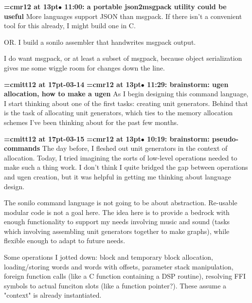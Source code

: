 {\smallskip\noindent\bf\font\titlefont=cmr12 at 13pt\titlefont $\bullet$ 11:00: a portable json2msgpack utility could be useful}\smallskip
More languages support JSON than msgpack. If there isn't a convenient tool for this already, I might build one in C.
\par

OR. I build a sonilo assembler that handwrites msgpack output.
\par

I do want msgpack, or at least a subset of msgpack, because object serialization gives me some wiggle room for changes down the line.
\par

{\medskip\noindent\bf\font\titlefont=cmitt12 at 17pt-03-14}\medskip
{\smallskip\noindent\bf\font\titlefont=cmr12 at 13pt\titlefont $\bullet$ 11:29: brainstorm: ugen allocation, how to make a ugen}\smallskip
As I begin designing this command language, I start thinking about one of the first tasks: creating unit generators. Behind that is the task of allocating unit generators, which ties to the memory allocation schemes I've been thinking about for the past few months.
\par

{\medskip\noindent\bf\font\titlefont=cmitt12 at 17pt-03-15}\medskip
{\smallskip\noindent\bf\font\titlefont=cmr12 at 13pt\titlefont $\bullet$ 10:19: brainstorm: pseudo-commands}\smallskip
The day before, I fleshed out unit generators in the context of allocation. Today, I tried imagining the sorts of low-level operations needed to make such a thing work. I don't think I quite bridged the gap between operations and ugen creation, but it was helpful in getting me thinking about language design.
\par

The sonilo command language is not going to be about abstraction. Re-usable modular code is not a goal here. The idea here is to provide a bedrock with enough functionality to support my needs involving music and sound (tasks which involving assembling unit generators together to make graphs), while flexible enough to adapt to future needs.
\par

Some operations I jotted down: block and temporary block allocation, loading/storing words and words with offsets, parameter stack manipulation, foreign function calls (like a C function containing a DSP routine), resolving FFI symbols to actual funciton slots (like a function pointer?). These assume a "context" is already instantiated.
\par

